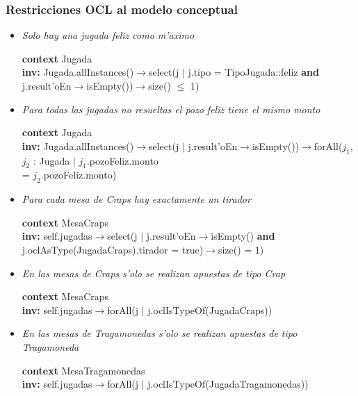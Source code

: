 \subsubsection{Restricciones OCL al modelo conceptual}
\begin{itemize}



\item \textit{Solo hay una jugada feliz como m'aximo}

\textbf{context} Jugada \\ \textbf{inv:}
    Jugada.allInstances()$\rightarrow$select(j $|$ j.tipo = TipoJugada::feliz \textbf{and} j.result'oEn$\rightarrow$isEmpty())$\rightarrow$size() $\leq$ 1)



\item \textit{Para todas las jugadas no resueltas el pozo feliz tiene el mismo monto}

\textbf{context} Jugada \\ \textbf{inv:}
    Jugada.allInstances()$\rightarrow$select(j $|$ j.result'oEn$\rightarrow$isEmpty())$\rightarrow$forAll($j_{1}$, $j_{2}$ : Jugada $|$ $j_{1}$.pozoFeliz.monto\\ = $j_{2}$.pozoFeliz.monto)



\item \textit{Para cada mesa de Craps hay exactamente un tirador}

\textbf{context}  MesaCraps \\ \textbf{inv:} 
    self.jugadas$\rightarrow$select(j $|$ j.result'oEn$\rightarrow$isEmpty() \textbf{and} j.oclAsType(JugadaCraps).tirador = true)$\rightarrow$size() = 1)



\item \textit{En las mesas de Craps s'olo se realizan apuestas de tipo Crap} 

\textbf{context}  MesaCraps \\ \textbf{inv:} 
    self.jugadas$\rightarrow$forAll(j $|$ j.oclIsTypeOf(JugadaCraps))



\item \textit{En las mesas de Tragamonedas s'olo se realizan apuestas de tipo Tragamoneda}

\textbf{context}  MesaTragamonedas \\ \textbf{inv:} 
    self.jugadas$\rightarrow$forAll(j $|$ j.oclIsTypeOf(JugadaTragamonedas))




\end{itemize}
